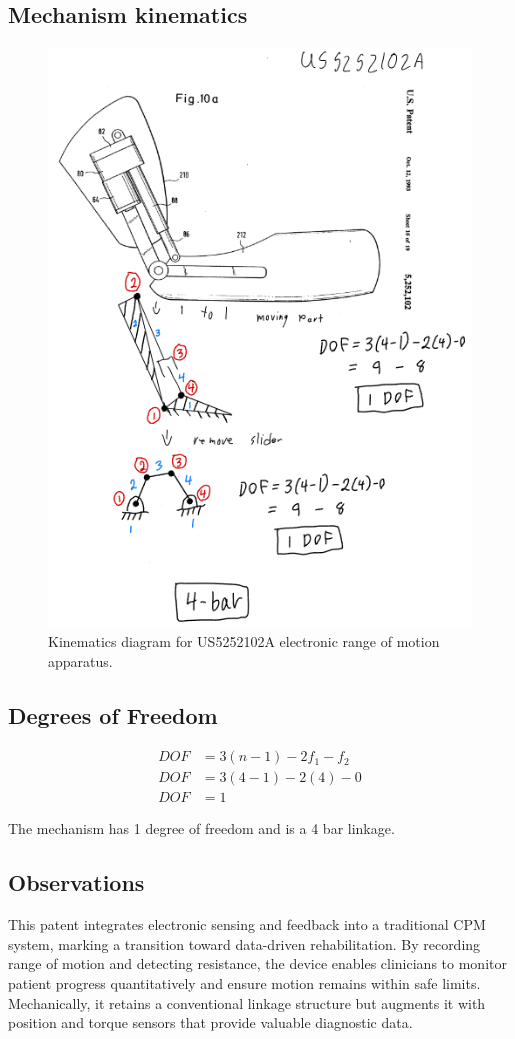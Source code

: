\documentclass[11pt]{article}
\begin{document}
\subsection{Mechanism kinematics}
\begin{figure}[H]
  \centering
  \includegraphics[width=0.54\linewidth]{../Kinematic Mechanism Images/5252102.png}
  \caption{Kinematics diagram for US5252102A electronic range of motion apparatus.}
  \label{fig:US5252102A_kinematics}
\end{figure}

\subsection{Degrees of Freedom}
\[
\begin{aligned}
DOF &= 3(n-1) - 2f_1 - f_2 \\
DOF &= 3(4-1) - 2(4) - 0 \\
DOF &= 1
\end{aligned}
\]

The mechanism has 1 degree of freedom and is a 4 bar linkage.

\subsection{Observations}
This patent integrates electronic sensing and feedback into a traditional CPM system, marking a transition toward data-driven rehabilitation. By recording range of motion and detecting resistance, the device enables clinicians to monitor patient progress quantitatively and ensure motion remains within safe limits. Mechanically, it retains a conventional linkage structure but augments it with position and torque sensors that provide valuable diagnostic data.
\end{document}
